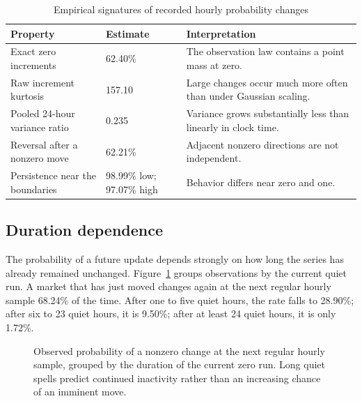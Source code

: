 \documentclass[11pt]{article}
\begin{document}
\begin{table}[htbp]
\centering
\caption{Empirical signatures of recorded hourly probability changes}
\label{tab:signatures}
\begin{tabularx}{\textwidth}{YlY}
\toprule
Property & Estimate & Interpretation \\
\midrule
Exact zero increments & 62.40\% & The observation law contains a point mass at zero. \\
Raw increment kurtosis & 157.10 & Large changes occur much more often than under Gaussian scaling. \\
Pooled 24-hour variance ratio & 0.235 & Variance grows substantially less than linearly in clock time. \\
Reversal after a nonzero move & 62.21\% & Adjacent nonzero directions are not independent. \\
Persistence near the boundaries & 98.99\% low; 97.07\% high & Behavior differs near zero and one. \\
\bottomrule
\end{tabularx}
\end{table}

\subsection{Duration dependence}

The probability of a future update depends strongly on how long the series has already remained
unchanged. Figure~\ref{fig:duration} groups observations by the current quiet run. A market that
has just moved changes again at the next regular hourly sample 68.24\% of the time. After one to
five quiet hours, the rate falls to 28.90\%; after six to 23 quiet hours, it is 9.50\%; after at
least 24 quiet hours, it is only 1.72\%.

\begin{figure}[htbp]
\centering
{}
\caption{Observed probability of a nonzero change at the next regular hourly sample, grouped by
the duration of the current zero run. Long quiet spells predict continued inactivity rather than
an increasing chance of an imminent move.}
\label{fig:duration}
\end{figure}
\end{document}
